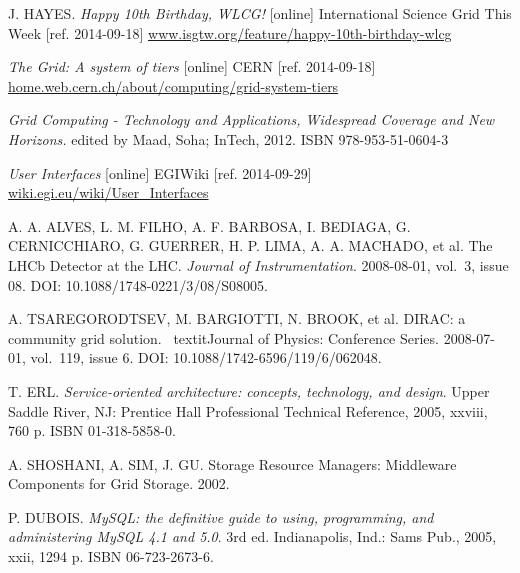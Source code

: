 
\def\bibname{Bibliography}
\begin{thebibliography}{99}
\addcontentsline{toc}{chapter}{\bibname}


	J. HAYES. 
	\emph{Happy 10th Birthday, WLCG!} [online]
	International Science Grid This Week [ref. 2014-09-18]
	\url{www.isgtw.org/feature/happy-10th-birthday-wlcg}

	\emph{The Grid: A system of tiers} [online] 
	CERN [ref. 2014-09-18]
	\url{home.web.cern.ch/about/computing/grid-system-tiers}

	\emph{Grid Computing - Technology and Applications, Widespread Coverage and New Horizons.} 
	edited by Maad, Soha; InTech, 2012.
	ISBN 978-953-51-0604-3

	\emph{User Interfaces} [online] 
	EGIWiki [ref. 2014-09-29]
	\url{wiki.egi.eu/wiki/User_Interfaces}
	
	A. A. ALVES, L. M. FILHO, A. F. BARBOSA, I. BEDIAGA, G. CERNICCHIARO, G. GUERRER, H. P. LIMA, A. A. MACHADO, et al. 
	The LHCb Detector at the LHC.
	\textit{Journal of Instrumentation}. 
	2008-08-01, vol.~3, issue 08. 
	DOI: 10.1088/1748-0221/3/08/S08005.
	
	A. TSAREGORODTSEV, M. BARGIOTTI, N. BROOK, et al. 
	DIRAC: a community grid solution. \
	textit{Journal of Physics: Conference Series}. 2008-07-01, vol.~119, issue 6.
	DOI: 10.1088/1742-6596/119/6/062048.
	
	T. ERL. 
	\textit{Service-oriented architecture: concepts, technology, and design}. 
	Upper Saddle River, NJ: Prentice Hall Professional Technical Reference, 2005, xxviii, 
	760 p. ISBN 01-318-5858-0.

	
	A. SHOSHANI,  A. SIM, J. GU. 
	Storage Resource Managers: Middleware Components for Grid Storage. 
	2002.
	
	P. DUBOIS. \textit{MySQL: the definitive guide to using, programming, and administering MySQL 4.1 and 5.0}. 
	3rd ed. Indianapolis, Ind.: Sams Pub., 2005, xxii, 1294 p. ISBN 06-723-2673-6.


\end{thebibliography}
